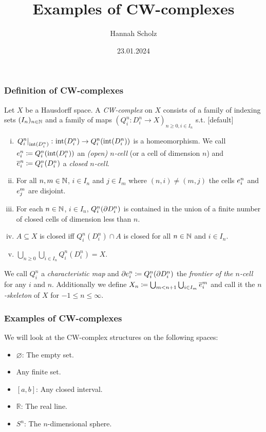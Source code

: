 \documentclass{beamer}
\title{Examples of CW-complexes}
\author{Hannah Scholz}
\institute[MI]{Mathematical Institute of the University of Bonn}
\date{23.01.2024}
\begin{document}
\frame{\titlepage}

\begin{frame}
\frametitle{Definition of CW-complexes}
  Let $X$ be a Hausdorff space.
    A \emph{CW-complex} on $X$ consists of a family of indexing sets $(I_n)_{n \in \bN}$ and a family of maps $(Q_i^n\colon D_i^n\rightarrow X)_{n \ge 0, i \in I_n}$ s.t.
    [default]
    \begin{enumerate}[(i)]
        \item $\restrict{Q_i^n}{\interior{D_i^n}}\colon \interior{D_i^n} \rightarrow Q_i^n(\interior{D_i^n})$ is a homeomorphism. We call $\openCell{n}{i} \coloneq Q_i^n(\interior{D_i^n})$ an \emph{(open) $n$-cell} (or a cell of dimension $n$)
        and $\closedCell{n}{i} \coloneq Q_i^n(D_i^n)$ a \emph{closed $n$-cell}.
        \item For all $n, m \in \bN$, $i \in I_n$ and $j \in I_m$ where $(n, i) \ne (m, j)$ the cells $\openCell{n}{i}$ and $\openCell{m}{j}$ are disjoint.
        \item For each $n \in \bN$, $i \in I_n$, $Q_i^n(\boundary D_i^n)$ is contained in the union of a finite number of closed cells of dimension less than $n$.
        \item $A \subseteq X$ is closed iff $Q_i^n(D_i^n) \cap A$ is closed for all $n \in \bN$ and $i \in I_n$.
        \item $\bigcup_{n \ge 0}\bigcup_{i \in I_n} Q_i^n(D_i^n) = X$.
    \end{enumerate}
    We call $Q_i^n$ a \emph{characteristic map} and $\cellFrontier{n}{i} \coloneq Q_i^n(\boundary D_i^n)$ the \emph{frontier of the $n$-cell} for any $i$ and $n$.
    Additionally we define $X_n \coloneq \bigcup_{m < n + 1} \bigcup_{i \in I_m} \closedCell{m}{i}$ and call it the \emph{$n$-skeleton} of $X$ for $-1 \le n \le \infty$.
\end{frame}

\begin{frame}
  \frametitle{Examples of CW-complexes}
  We will look at the CW-complex structures on the following spaces: 
  \begin{itemize}
    \item $\varnothing$: The empty set. 
    \item Any finite set. 
    \item $[a, b]$: Any closed interval.
    \item $\mathbb{R}$: The real line. 
    \item $S^n$: The $n$-dimensional sphere.
  \end{itemize}
\end{frame}
\end{document}
